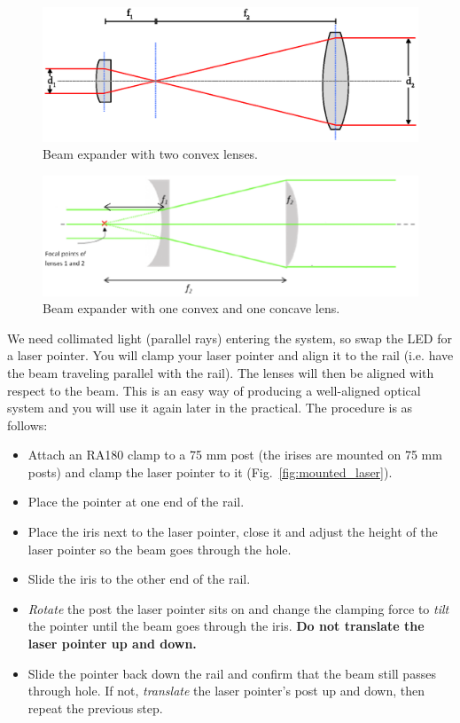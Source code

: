 \documentclass[a4paper]{report}
\begin{document}
\begin{figure}[h]
\center
\includegraphics[width=4.5in]{beamExpander1.eps}
\caption{Beam expander with two convex lenses.}
\label{beamExpander1}
\end{figure}

\begin{figure}[h]
\center
\includegraphics[width=4.5in]{beamExpander2.eps}
\caption{Beam expander with one convex and one concave lens.}
\label{beamExpander2}
\end{figure}

We need collimated light (parallel rays) entering the system, so swap the LED for a laser pointer.
You will clamp your laser pointer and align it to the rail (i.e. have the beam traveling parallel with the rail). 
The lenses will then be aligned with respect to the beam. 
This is an easy way of producing a well-aligned optical system and you will use it again later in the practical.
The procedure is as follows:

\begin{itemize}
\item Attach an RA180 clamp to a 75 mm post (the irises are mounted on 75 mm posts) and clamp the laser pointer to it (Fig.~\ref{fig:mounted_laser}).
\item Place the pointer at one end of the rail.
\item Place the iris next to the laser pointer, close it and adjust the height of the laser pointer so the beam goes through the hole. 
\item Slide the iris to the other end of the rail. 
\item \textit{Rotate} the post the laser pointer sits on and change the clamping force to \textit{tilt} the pointer until the beam goes through the iris. 
\textbf{Do not translate the laser pointer up and down.}
\item Slide the pointer back down the rail and confirm that the beam still passes through hole. 
If not, \textit{translate} the laser pointer's post up and down, then repeat the previous step.
\end{itemize}
\end{document}

